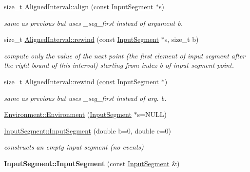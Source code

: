 \begin{DoxyCompactItemize}
\mbox{\label{group__segment_ga85de404c4ddf91a51bf0c29c6dbe1d77}} 
size\+\_\+t \mbox{\hyperlink{group__segment_ga85de404c4ddf91a51bf0c29c6dbe1d77}{Aligned\+Interval\+::align}} (const \mbox{\hyperlink{classInputSegment}{Input\+Segment}} $\ast$s)
\begin{DoxyCompactList}\small\item\em same as previous but uses \+\_\+seg\+\_\+first instead of argument b. \end{DoxyCompactList}\item 
size\+\_\+t \mbox{\hyperlink{group__segment_gafad6a7eea9e5892cfae9986f6263a738}{Aligned\+Interval\+::rewind}} (const \mbox{\hyperlink{classInputSegment}{Input\+Segment}} $\ast$s, size\+\_\+t b)
\begin{DoxyCompactList}\small\item\em compute only the value of the next point (the first element of input segment after the right bound of this interval) starting from index b of input segment point. \end{DoxyCompactList}\item 
\mbox{\label{group__segment_ga1a6a8f006c2d11e8f4af7250a6fb0b16}} 
size\+\_\+t \mbox{\hyperlink{group__segment_ga1a6a8f006c2d11e8f4af7250a6fb0b16}{Aligned\+Interval\+::rewind}} (const \mbox{\hyperlink{classInputSegment}{Input\+Segment}} $\ast$)
\begin{DoxyCompactList}\small\item\em same as previous but uses \+\_\+seg\+\_\+first instead of arg. b. \end{DoxyCompactList}\item 
\mbox{\hyperlink{group__segment_ga35cbd86caf5c17f8d59559ae0b28febf}{Environment\+::\+Environment}} (\mbox{\hyperlink{classInputSegment}{Input\+Segment}} $\ast$s=N\+U\+LL)
\item 
\mbox{\hyperlink{group__segment_gaec471ec05052a932b1bb2738bfc8b172}{Input\+Segment\+::\+Input\+Segment}} (double b=0, double e=0)
\begin{DoxyCompactList}\small\item\em constructs an empty input segment (no events) \end{DoxyCompactList}\item 
\mbox{\label{group__segment_ga0ca7fa41c0dadabbaa112fdde9e48492}} 
{\bfseries Input\+Segment\+::\+Input\+Segment} (const \mbox{\hyperlink{classInputSegment}{Input\+Segment}} \&)

\end{DoxyCompactItemize}
